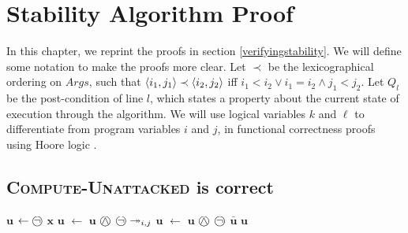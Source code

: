 \chapter{Stability Algorithm Proof}
\label{stabilityproof}

In this chapter, we reprint the proofs in section \ref{verifyingstability}. We will define some notation to make the proofs more clear. Let $\prec$ be the lexicographical ordering on $Args$, such that $\langle{i_1},{j_1}\rangle\prec\langle{i_2},{j_2}\rangle$ iff $i_1<i_2\lor i_1=i_2\land j_1<j_2$. Let $Q_l$ be the post-condition of line $l$, which states a property about the current state of execution through the algorithm. We will use logical variables $k$ and $\ell$ to differentiate from program variables $i$ and $j$, in functional correctness proofs using Hoore logic \cite{hoare}.

\section{\textsc{Compute-Unattacked} is correct}

\begin{algorithm}[H]
	\begin{algorithmic}[1]
			\State $\mathbf{u}$ $\gets\incircbin{\neg}$ $\mathbf{x}$
					\State $\mathbf{u}$ $\gets$ $\mathbf{u}$ $\incircbin{\land}$ $\incircbin{\neg}\twoheadrightarrow_{i,j}$
				\EndIf
			\EndFor
			\State $\mathbf{u}$ $\gets$ $\mathbf{u}$ $\incircbin{\land}$ $\incircbin{\neg}$ $\bar{\mathbf{u}}$
			\State \Return $\mathbf{u}$
		\EndFunction
	\end{algorithmic}
\end{algorithm}

